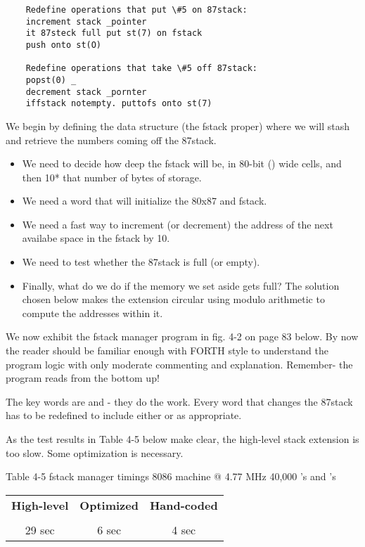 \begin{lstlisting}
    Redefine operations that put \#5 on 87stack:
    increment stack _pointer
    it 87steck full put st(7) on fstack
    push onto st(O)

    Redefine operations that take \#5 off 87stack:
    popst(0) _
    decrement stack _pornter
    iffstack notempty. puttofs onto st(7)
\end{lstlisting}

We begin by defining the data structure (the fstack proper) where we will stash and retrieve the numbers coming off the 87stack.

\begin{itemize}
    \item We need to decide how deep the fstack will be, in 80-bit () wide cells, and then  10* that number of bytes of storage.
    \item We need a word that will initialize the 80x87 and fstack.
    \item We need a fast way to increment (or decrement) the address of the next availabe space in the fstack by 10.
    \item We need to test whether the 87stack is full (or empty).
    \item Finally, what do we do if the memory we set aside gets full? The solution chosen below makes the extension circular using modulo arithmetic to compute the addresses within it.
\end{itemize}

We now exhibit the fstack manager program in fig. 4-2 on page 83 below. By now the reader should be familiar enough with FORTH style to understand the program logic with only moderate commenting and explanation. Remember- the program reads from the bottom up!

The key words are  and - they do the work. Every word that changes the 87stack has to be redefined to include either  or  as appropriate.

As the test results in Table 4-5 below make clear, the high-level stack extension is too slow. Some optimization is necessary.

Table 4-5 fstack manager timings
8086 machine @ 4.77 MHz
40,000 's and 's
\begin{center}
    \begin{tabular}{|c c c|}
    \hline
        \textbf{High-level} & \textbf{Optimized} & \textbf{Hand-coded} \\
        \\
        29 sec              & 6 sec              & 4 sec \\
    \hline
    \end{tabular}
\end{center}

